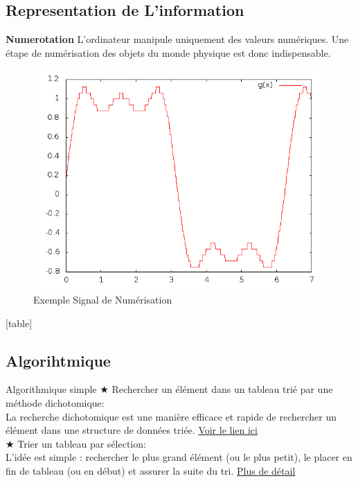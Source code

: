 \documentclass[a4paper, 12pt]{beamer}
\begin{document}
		\subsection{Representation de L'information}
	\begin{frame}
		\begin{block}{\textbf{Numerotation}}
	L'ordinateur manipule uniquement des valeurs numériques. Une étape de numérisation des objets du monde physique est donc indispensable.
	 \begin{figure}[!h]
  \centering
  \includegraphics[scale=0.3]{graphe1.png}
  \caption{Exemple Signal de Numérisation}
  \end{figure}
		\end{block}
\end{frame}

	[table]
	\subsection{Algorihtmique}
\begin{frame}
	\begin{block}{Algorithmique simple}
$\bigstar$ Rechercher un élément dans un tableau trié par une méthode dichotomique:\\
La recherche dichotomique est une manière efficace et rapide de rechercher un élément dans une structure de données triée. \href{http://openclassrooms.com/courses/recherche-dichotomique}{Voir le lien ici}\\
$\bigstar$ Trier un tableau par sélection:\\L'idée est simple : rechercher le plus grand élément (ou le plus petit), le placer en fin de tableau (ou en début) et assurer la suite du tri. \href{http://openclassrooms.com/courses/le-tri-par-selection}{Plus de détail}
	\end{block}
\end{frame}
	
\end{document}
